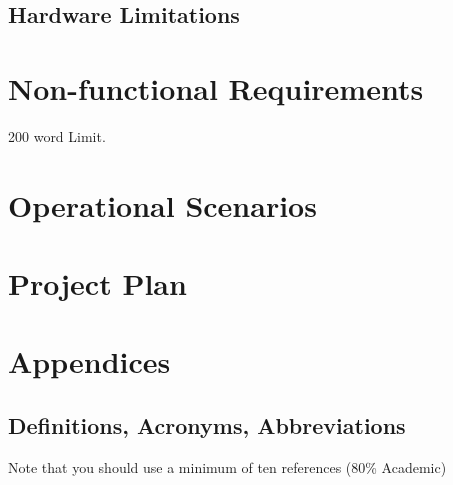 \documentclass[12pt]{article}
\begin{document}
\subsection{ Hardware Limitations}


\section{Non-functional Requirements}
200 word Limit.





\section{Operational Scenarios}

\section{Project Plan}


\section{Appendices}

\subsection{Definitions, Acronyms, Abbreviations}


\printbibliography
Note that you should use a minimum of ten references (80\% Academic)
\end{document}
